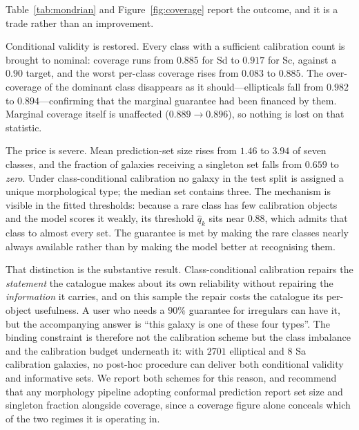 \documentclass[11pt]{article}
\begin{document}
Table~\ref{tab:mondrian} and Figure~\ref{fig:coverage} report the outcome, and
it is a trade rather than an improvement.

Conditional validity is restored. Every class with a sufficient calibration
count is brought to nominal: coverage runs from $0.885$ for Sd to $0.917$ for
Sc, against a $0.90$ target, and the worst per-class coverage rises from
$0.083$ to $0.885$. The over-coverage of the dominant class disappears as it
should---ellipticals fall from $0.982$ to $0.894$---confirming that the
marginal guarantee had been financed by them. Marginal coverage itself is
unaffected ($0.889 \rightarrow 0.896$), so nothing is lost on that statistic.

The price is severe. Mean prediction-set size rises from $1.46$ to $3.94$ of
seven classes, and the fraction of galaxies receiving a singleton set falls
from $0.659$ to \emph{zero}. Under class-conditional calibration no galaxy in
the test split is assigned a unique morphological type; the median set contains
three. The mechanism is visible in the fitted thresholds: because a rare class
has few calibration objects and the model scores it weakly, its threshold
$\hat q_k$ sits near $0.88$, which admits that class to almost every set. The
guarantee is met by making the rare classes nearly always available rather than
by making the model better at recognising them.

That distinction is the substantive result. Class-conditional calibration
repairs the \emph{statement} the catalogue makes about its own reliability
without repairing the \emph{information} it carries, and on this sample the
repair costs the catalogue its per-object usefulness. A user who needs a
$90\%$ guarantee for irregulars can have it, but the accompanying answer is
``this galaxy is one of these four types''. The binding constraint is therefore
not the calibration scheme but the class imbalance and the calibration budget
underneath it: with $2701$ elliptical and $8$ Sa calibration galaxies, no
post-hoc procedure can deliver both conditional validity and informative sets.
We report both schemes for this reason, and recommend that any morphology
pipeline adopting conformal prediction report set size and singleton fraction
alongside coverage, since a coverage figure alone conceals which of the two
regimes it is operating in.
\end{document}
